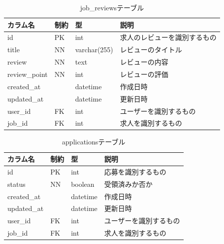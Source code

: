 \begin{table}[H]
  \centering
  \caption{job\_reviewsテーブル}
  \label{tab:db-job-reviews}
  \begin{tabular}{|l|l|l|l|} \hline
    カラム名          & 制約 & 型            & 説明             \\ \hline \hline
    id            & PK & int          & 求人のレビューを識別するもの \\ \hline
    title         & NN & varchar(255) & レビューのタイトル      \\ \hline
    review        & NN & text         & レビューの内容        \\ \hline
    review\_point & NN & int          & レビューの評価        \\ \hline
    created\_at   &    & datetime     & 作成日時           \\ \hline
    updated\_at   &    & datetime     & 更新日時           \\ \hline
    user\_id      & FK & int          & ユーザーを識別するもの    \\ \hline
    job\_id       & FK & int          & 求人を識別するもの      \\ \hline
  \end{tabular}
\end{table}

\begin{table}[H]
  \centering
  \caption{applicationsテーブル}
  \label{tab:db-applications}
  \begin{tabular}{|l|l|l|l|} \hline
    カラム名        & 制約 & 型        & 説明          \\ \hline \hline
    id          & PK & int      & 応募を識別するもの   \\ \hline
    status      & NN & boolean  & 受領済みか否か     \\ \hline
    created\_at &    & datetime & 作成日時        \\ \hline
    updated\_at &    & datetime & 更新日時        \\ \hline
    user\_id    & FK & int      & ユーザーを識別するもの \\ \hline
    job\_id     & FK & int      & 求人を識別するもの   \\ \hline
  \end{tabular}
\end{table}

